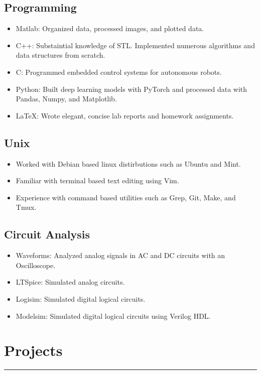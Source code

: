 \documentclass[10pt, letterpaper]{article}
\begin{document}
\subsection*{Programming}
\begin{itemize}[noitemsep]
	\item Matlab: Organized data, processed images, and plotted data.
	\item C++: Substaintial knowledge of STL. Implemented numerous algorithms and data structures from scratch.
	\item C: Programmed embedded control systems for autonomous robots.
	\item Python: Built deep learning models with PyTorch and processed data with Pandas, Numpy, and Matplotlib.
	\item \LaTeX: Wrote elegant, concise lab reports and homework assignments.
\end{itemize}

\subsection*{Unix}
\begin{itemize}[noitemsep]
	\item Worked with Debian based linux distirbutions such as Ubuntu and Mint.
	\item Familiar with terminal based text editing using Vim.
	\item Experience with command based utilities such as Grep, Git, Make, and Tmux.
\end{itemize}

\subsection*{Circuit Analysis}
\begin{itemize}[noitemsep]
	\item Waveforms: Analyzed analog signals in AC and DC circuits with an Oscilloscope.	
	\item LTSpice: Simulated analog circuits.
	\item Logisim: Simulated digital logical circuits.
	\item Modelsim: Simulated digital logical circuits using Verilog HDL.
\end{itemize}

\section*{Projects}
\hrule
\vspace{7pt}
\end{document}
